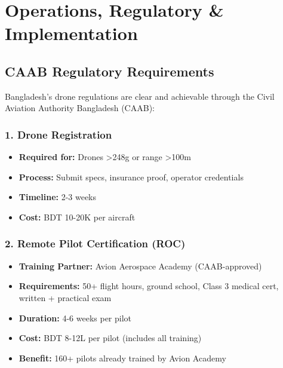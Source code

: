 
\chapter{Operations, Regulatory \& Implementation}

\section{CAAB Regulatory Requirements}

Bangladesh's drone regulations are clear and achievable through the Civil Aviation Authority Bangladesh (CAAB):

\subsection{1. Drone Registration}

\begin{itemize}
    \item \textbf{Required for:} Drones >248g or range >100m
    \item \textbf{Process:} Submit specs, insurance proof, operator credentials
    \item \textbf{Timeline:} 2-3 weeks
    \item \textbf{Cost:} BDT 10-20K per aircraft
\end{itemize}

\subsection{2. Remote Pilot Certification (ROC)}

\begin{itemize}
    \item \textbf{Training Partner:} Avion Aerospace Academy (CAAB-approved)
    \item \textbf{Requirements:} 50+ flight hours, ground school, Class 3 medical cert, written + practical exam
    \item \textbf{Duration:} 4-6 weeks per pilot
    \item \textbf{Cost:} BDT 8-12L per pilot (includes all training)
    \item \textbf{Benefit:} 160+ pilots already trained by Avion Academy
\end{itemize}

